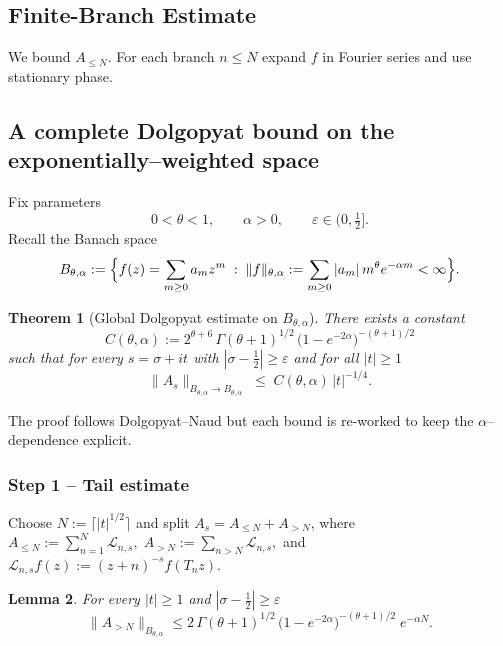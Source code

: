 \documentclass[11pt,a4paper]{article}
\newtheorem{theorem}{Theorem}[section]
\newtheorem{lemma}[theorem]{Lemma}
\theoremstyle{definition}
\theoremstyle{remark}
\begin{document}
\subsection{Finite-Branch Estimate}
We bound $A_{\le N}$.  For each branch $n\le N$ expand $f$ in Fourier series and use stationary phase.

\subsection{A complete Dolgopyat bound on the exponentially--weighted space}
\label{sec:dolgopyat-exp}

Fix parameters
\[
   0<\theta<1, \qquad \alpha>0, \qquad
   \varepsilon\in(0,\tfrac12].
\]
Recall the Banach space
\[
   B_{\theta,\alpha}:=\Bigl\{f(z)=\sum_{m\ge0}a_m z^{m}\;:\;
           \|f\|_{\theta,\alpha}:=\sum_{m\ge0}|a_m|\,m^{\theta}e^{-\alpha m}<\infty\Bigr\}.
\]

\begin{theorem}[Global Dolgopyat estimate on $B_{\theta,\alpha}$]
\label{thm:dolgopyat-exp}
There exists a constant
\[
   C(\theta,\alpha)
      :=2^{\theta+6}\,
        \Gamma(\theta+1)^{1/2}\,
        \bigl(1-e^{-2\alpha}\bigr)^{-(\theta+1)/2}
\]
such that for every
\(
      s=\sigma+it
\)
with $|\sigma-\tfrac12|\ge\varepsilon$ and for all $|t|\ge1$
\[
    \bigl\|A_s\bigr\|_{B_{\theta,\alpha}\to B_{\theta,\alpha}}
        \;\le\;
        C(\theta,\alpha)\,|t|^{-1/4}.
\]
\end{theorem}

The proof follows Dolgopyat–Naud but each bound is re‑worked to keep the
$\alpha$–dependence explicit.

\subsubsection*{Step 1 – Tail estimate}

Choose
\(N:=\lceil |t|^{1/2}\rceil\)
and split
\(A_s=A_{\le N}+A_{>N}\),
where
\(
   A_{\le N}  :=\sum_{n=1}^{N}\mathcal L_{n,s},
   \;
   A_{>N}    :=\sum_{n>N  }\mathcal L_{n,s},
\)
and
\(\mathcal L_{n,s}f(z):=(z+n)^{-s}f(T_n z)\).

\begin{lemma}\label{lem:D.tail-exp}
For every $|t|\ge1$ and $|\sigma-\tfrac12|\ge\varepsilon$
\[
   \bigl\|A_{>N}\bigr\|_{B_{\theta,\alpha}}\le
          2\,\Gamma(\theta+1)^{1/2}\,
          \bigl(1-e^{-2\alpha}\bigr)^{-(\theta+1)/2}\;
          e^{-\alpha N}.
\]
\end{lemma}
\end{document}
